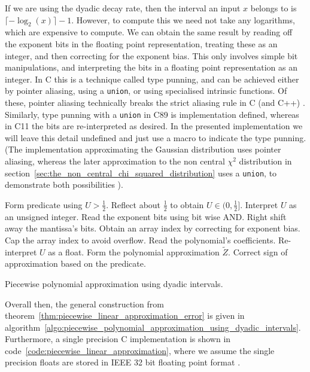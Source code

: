 \documentclass[manuscript,review]{acmart}
\begin{document}
If we are using the dyadic decay rate, then the interval an input $ x $  belongs to is $ \lceil -{\log}_2(x) \rceil - 1 $. However, to compute this we need not take any logarithms, which are expensive to compute. We can obtain the same result by reading off the exponent bits in the floating point representation, treating these as an integer, and then correcting for the exponent bias.  This only involves simple bit manipulations, and interpreting the bits in a floating point representation as an integer. In C this is a technique called type punning, and can be achieved either by pointer aliasing, using a \texttt{union}, or using specialised intrinsic functions. Of these, pointer aliasing technically breaks the strict aliasing rule in C (and C++) \citep[6.5.2.3]{iso2012c11} \citep[pages~163--164]{stallman2020gcc}. Similarly, type punning with a \texttt{union} in C89 is implementation defined, whereas in C11 the bits are re-interpreted as desired. In the presented implementation we will leave this detail undefined and just use a macro to indicate the type punning. (The implementation approximating the Gaussian distribution uses pointer aliasing, whereas the later approximation to the non central $ \chi^2 $ distribution in section~\ref{sec:the_non_central_chi_squared_distribution} uses a \texttt{union}, to demonstrate both possibilities \citep{sheridan2020approximate_random}).

\begin{algorithm}[h!tb]
\DontPrintSemicolon
{}
Form predicate using $ U > \tfrac{1}{2} $.\;
Reflect about $ \tfrac{1}{2} $ to obtain $ U \in (0, \tfrac{1}{2}] $.\;
Interpret $ U $ as an unsigned integer.\;
Read the exponent bits using bit wise AND.\;
Right shift away the mantissa's bits.\;
Obtain an array index by correcting for exponent bias.\;
Cap the array index to avoid overflow.\;
Read the polynomial's coefficients.\;
Re-interpret $ U $ as a float.\;
Form the polynomial approximation $ \widetilde{Z} $.\;
Correct sign of approximation based on the predicate.\;
\caption{Piecewise polynomial approximation using dyadic intervals.}
\label{algo:piecewise_polynomial_approximation_using_dyadic_intervals}
\end{algorithm}

Overall then, the general construction from theorem~\ref{thm:piecewise_linear_approximation_error} is given in algorithm~\ref{algo:piecewise_polynomial_approximation_using_dyadic_intervals}. Furthermore, a single precision C implementation is shown in code~\ref{code:piecewise_linear_approximation}, where we assume the single precision floats are stored in IEEE 32 bit floating point format \citep{ieee2008ieee}. 
\end{document}
